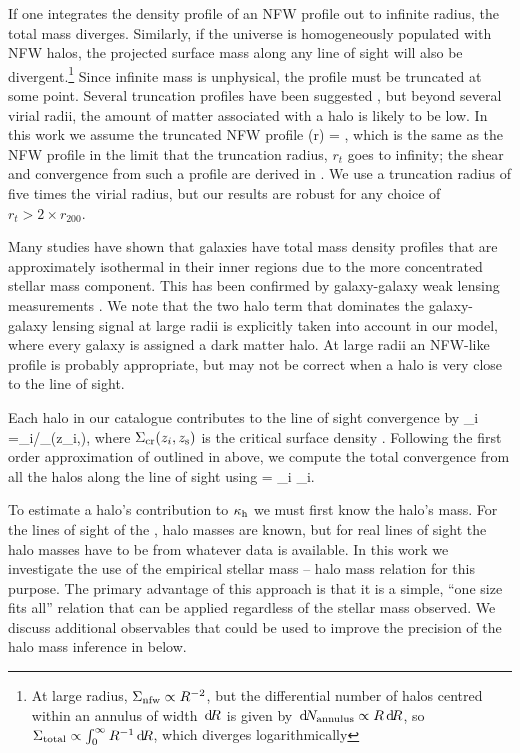 \documentclass[useAMS,usenatbib,a4paper]{mn2e}
\begin{document}
If one integrates the density profile of an NFW profile out to infinite
radius, the total mass diverges. Similarly, if the universe is
homogeneously populated with NFW halos, the projected surface mass along
any line of sight will also be divergent.\footnote{At large radius,
$\Sigma_{\rm nfw} \propto R^{-2}$, but the differential number of halos
centred within an annulus of width $\, \mathrm{d} \! R$ is given by $\, \mathrm{d} \! N_{\rm
annulus} \propto R \, \mathrm{d} \! R$, so  $\Sigma_{\rm total} \propto
\int_{0}^{\infty} R^{-1} \, \mathrm{d} \! R$, which diverges logarithmically} Since
infinite mass is unphysical, the profile must be truncated at some
point. Several truncation profiles have been suggested
\citep[e.g][]{BMO}, but beyond several virial radii, the amount of
matter associated with a halo is likely to be low. In this work we
assume the truncated NFW profile
\be\label{eq:bmoprofile}
\rho(r) = 
,
\ee
which is the same as the NFW profile in the limit that the truncation
radius, $r_t$ goes to infinity; the shear and convergence from such a
profile are derived in \citet{BMO}.
 We use a truncation radius of five times
the virial radius, but our results are robust for any choice of $r_t>2
\times r_{200}$. 

Many studies have shown that galaxies have total mass density profiles that
are approximately isothermal in their inner regions
\citep[\eg][]{AugerEtal2010} due to the more concentrated stellar mass
component.
This has been confirmed by galaxy-galaxy weak lensing measurements 
\citep[\eg][]{Mandelbaum}. We note that the two halo term that
dominates the galaxy-galaxy lensing signal at large radii is explicitly taken
into account in our model, where every galaxy is assigned a dark matter halo.
At large radii an NFW-like profile is probably appropriate, but may not be
correct when a halo is very close to the line of sight.


Each halo in our catalogue contributes to
the line of sight convergence by
\be
\label{eq:kappai}
\kappa_i =\Sigma_{i}/\Sigma_{}(z_i,\zs),
\ee
where $\Sigma_{\mathrm{cr}}(z_i,z_{\rm s})$ is the critical surface density .
Following the first order approximation of \citet{HilbertEtal2009}
outlined in  above, we compute 
the total convergence from all the halos along the line
of sight using
\be 
\label{eq:kappasummu}
\kappah = \sum_{i} \kappa_i.
\ee

To estimate a halo's contribution to $\kappa_{\rm h}$ we must first know the
halo's mass. For the lines of sight of the \MS, halo masses are
known, but for  real lines of sight the halo masses have to be \infered
from whatever data is available. 
In this work we investigate the use of the empirical stellar mass --
halo mass relation for this purpose. The primary advantage of this
approach is that it is a simple, ``one size fits all'' relation that can
be applied regardless of the stellar mass observed. We discuss
additional observables that could be used to improve the precision of
the halo mass inference in  below. 
\end{document}
